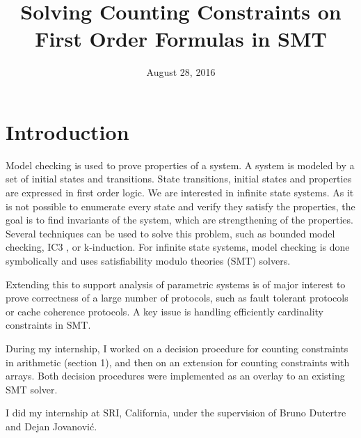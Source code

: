 \documentclass[]{article}
\title{Solving Counting Constraints on First Order Formulas in SMT}
\date{August 28, 2016}
\begin{document}
\maketitle

{
\setcounter{tocdepth}{3}
\tableofcontents
}

\newtheorem{definition}{Definition} \newtheorem{lemma}{Lemma}
\newtheorem{theorem}{Theorem} \newtheorem{property}{Property}
\newtheorem{example}{Example}

\newpage

\section*{Introduction}\label{introduction}


Model checking is used to prove properties of a system. A system is modeled by a set
of initial states and transitions. State transitions, initial states and properties are expressed in
first order logic. We are interested in infinite state systems. As it is not possible to enumerate
every state and verify they satisfy the properties, the goal is to find invariants of the system,
which are strengthening of the properties. Several techniques can be used to solve this problem,
such as bounded model checking, IC3 \cite{pdr}, or k-induction. For infinite state systems, model
checking is done symbolically and uses satisfiability modulo theories (SMT) solvers.

Extending this to support analysis of parametric systems is of major interest to prove correctness
of a large number of protocols, such as fault tolerant protocols\cite{AlbertiGP16} or cache coherence
protocols\cite{ConchonGKMZ12}. A key issue is handling efficiently cardinality constraints in
SMT.

During my internship, I worked on a decision procedure for counting constraints in arithmetic
(section 1), and then on an extension for counting constraints with arrays. Both decision
procedures were implemented as an overlay to an existing SMT solver.

I did my internship at SRI, California, under the supervision of Bruno Dutertre and Dejan
Jovanović.



\end{document}
